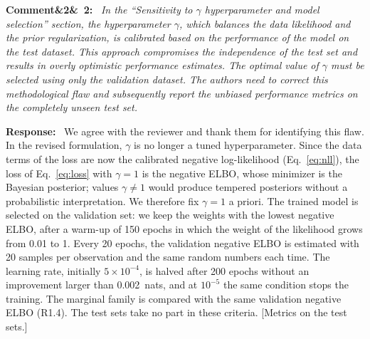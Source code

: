 \documentclass[11pt]{article}
\newenvironment{rcomment}[1]{\par\bigskip\noindent\textbf{Comment\ifx&#1&\else\ #1\fi:}\ \itshape}{\par}
\newenvironment{response}{\par\smallskip\noindent\color{resp}\textbf{Response:}\ }{\par}
\newcommand{\tbd}[1]{\textcolor{note}{\textsf{[#1]}}}
\begin{document}
\begin{rcomment}{2}
In the ``Sensitivity to $\gamma$ hyperparameter and model selection'' section, the hyperparameter $\gamma$, which
balances the data likelihood and the prior regularization, is calibrated based on the performance of the model on the
test dataset. This approach compromises the independence of the test set and results in overly optimistic performance
estimates. The optimal value of $\gamma$ must be selected using only the validation dataset. The authors need to
correct this methodological flaw and subsequently report the unbiased performance metrics on the completely unseen test
set.
\end{rcomment}

\begin{response}
We agree with the reviewer and thank them for identifying this flaw. In the revised formulation, $\gamma$ is no longer
a tuned hyperparameter. Since the data terms of the loss are now the calibrated negative log-likelihood
(Eq.~\eqref{eq:nll}), the loss of Eq.~\eqref{eq:loss} with $\gamma=1$ is the negative ELBO, whose minimizer is the
Bayesian posterior; values $\gamma\neq1$ would produce tempered posteriors without a probabilistic interpretation. We
therefore fix $\gamma=1$ a priori. The trained model is selected on the validation set: we keep the weights with the
lowest negative ELBO, after a warm-up of 150 epochs in which the weight of the likelihood grows from 0.01 to 1. Every 20
epochs, the validation negative ELBO is estimated with 20 samples per observation and the same random numbers each time.
The learning rate, initially $5\times10^{-4}$, is halved after 200 epochs without an improvement larger than 0.002~nats,
and at $10^{-5}$ the same condition stops the training. The marginal family is compared with the same validation
negative ELBO (R1.4). The test sets take no part in these criteria.
\tbd{Metrics on the test sets.}


\end{response}
\end{document}
